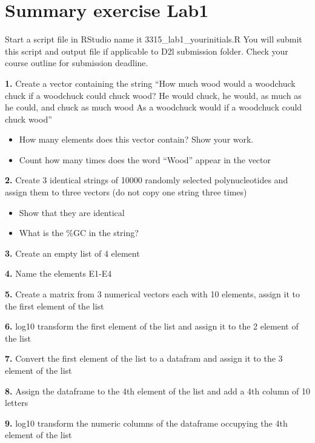 \documentclass[
]{book}
\theoremstyle{definition}
\theoremstyle{definition}
\theoremstyle{definition}
\theoremstyle{definition}
\theoremstyle{remark}
\begin{document}
\hypertarget{summary-exercise-lab1}{%
\section*{\texorpdfstring{\textbf{Summary exercise Lab1}}{Summary exercise Lab1}}\label{summary-exercise-lab1}}

Start a script file in RStudio name it 3315\_lab1\_yourinitials.R
You will submit this script and output file if applicable to D2l submission folder.
Check your course outline for submission deadline.

\textbf{1.} Create a vector containing the string ``How much wood would a woodchuck chuck if a woodchuck could chuck wood? He would chuck, he would, as much as he could, and chuck as much wood
As a woodchuck would if a woodchuck could chuck wood''

\begin{itemize}
\item
  How many elements does this vector contain? Show your work.
\item
  Count how many times does the word ``Wood'' appear in the vector
\end{itemize}

\textbf{2.} Create 3 identical strings of 10000 randomly selected polynucleotides and assign them to three vectors (do not copy one string three times)

\begin{itemize}
\item
  Show that they are identical
\item
  What is the \%GC in the string?
\end{itemize}

\textbf{3.} Create an empty list of 4 element

\textbf{4.} Name the elements E1-E4

\textbf{5.} Create a matrix from 3 numerical vectors each with 10 elements, assign it to the first element of the list

\textbf{6.} log10 transform the first element of the list and assign it to the 2 element of the list

\textbf{7.} Convert the first element of the list to a datafram and assign it to the 3 element of the list

\textbf{8.} Assign the dataframe to the 4th element of the list and add a 4th column of 10 letters

\textbf{9.} log10 transform the numeric columns of the dataframe occupying the 4th element of the list
\end{document}
